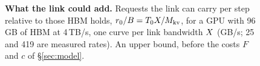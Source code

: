 \begin{figure}[t]
\caption{\textbf{What the link could add.} Requests the link can carry per step
relative to those HBM holds, $r_0/B = T_0X/M_{\mathrm{kv}}$, for a GPU with
96\,GB of HBM at 4\,TB/s, one curve per link bandwidth $X$ (GB/s; 25 and
419 are measured rates). An upper bound, before the costs $F$ and $c$ of
\S\ref{sec:model}.}
\label{fig:potential}
\end{figure}
